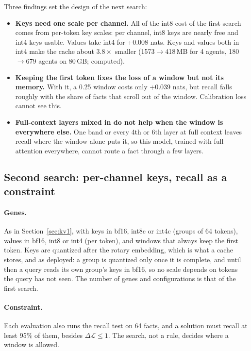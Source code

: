 \documentclass[11pt]{article}
\newcommand{\dloss}{\Delta\mathcal{L}}
\begin{document}
\noindent Three findings set the design of the next search:
\begin{itemize}
  \item \textbf{Keys need one scale per channel.} All of the int8 cost of the first search comes from
        per-token key scales: per channel, int8 keys are nearly free and int4 keys usable. Values take
        int4 for +0.008 nats. Keys and values both in int4 make the cache about $3.8\times$ smaller
        (1573$\rightarrow$418\,MB for 4 agents, 180$\rightarrow$679 agents on 80\,GB; computed).
  \item \textbf{Keeping the first token fixes the loss of a window but not its memory.} With it, a 0.25
        window costs only +0.039 nats, but recall falls roughly with the share of facts that scroll out
        of the window. Calibration loss cannot see this.
  \item \textbf{Full-context layers mixed in do not help when the window is everywhere else.} One band or
        every 4th or 6th layer at full context leaves recall where the window alone puts it, so this
        model, trained with full attention everywhere, cannot route a fact through a few layers.
\end{itemize}

\subsection{Second search: per-channel keys, recall as a constraint}
\label{sec:kv2}
\paragraph{Genes.} As in Section~\ref{sec:kv1}, with keys in bf16, int8c or int4c (groups of 64 tokens),
values in bf16, int8 or int4 (per token), and windows that always keep the first token. Keys are quantized
after the rotary embedding, which is what a cache stores, and as deployed: a group is quantized only once
it is complete, and until then a query reads its own group's keys in bf16, so no scale depends on tokens
the query has not seen. The number of genes and configurations is that of the first search.

\paragraph{Constraint.} Each evaluation also runs the recall test on 64 facts, and a solution must recall
at least 95\% of them, besides $\dloss\le1$. The search, not a rule, decides where a window is allowed.
\end{document}

